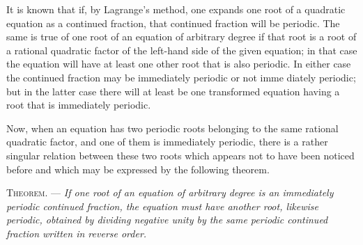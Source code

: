 
It is known that if, by Lagrange's method, one expands one root of a quadratic
equation as a continued fraction, that continued fraction will be periodic.
The same is true of one root of an equation of arbitrary degree if that root
is a root of a rational quadratic factor of the left-hand side of the given
equation; in that case the equation will have at least one other root that is
also periodic. In either case the continued fraction may be immediately
periodic or not imme%
%
diately periodic; but in the latter case there will at least be one transformed
equation having a root that is immediately periodic.

Now, when an equation has two periodic roots belonging to the same rational
quadratic factor, and one of them is immediately periodic, there is a rather
singular relation between these two roots which appears not to have been
noticed before and which may be expressed by the following theorem.

\medskip
\noindent\textsc{Theorem.} — \emph{If one root of an equation of arbitrary
degree is an immediately periodic continued fraction, the equation must have
another root, likewise periodic, obtained by dividing negative unity by the
same periodic continued fraction written in reverse order.}
\medskip

